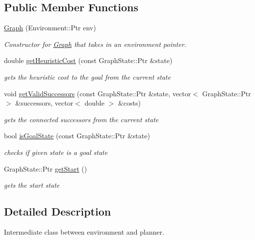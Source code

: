 \subsection*{\-Public \-Member \-Functions}
\begin{DoxyCompactItemize}
\item 
\hypertarget{class_graph_af17d59fad8e889152f8367600d1a6094}{\hyperlink{class_graph_af17d59fad8e889152f8367600d1a6094}{\-Graph} (\-Environment\-::\-Ptr env)}\label{class_graph_af17d59fad8e889152f8367600d1a6094}

\begin{DoxyCompactList}\small\item\em \-Constructor for \hyperlink{class_graph}{\-Graph} that takes in an environment pointer. \end{DoxyCompactList}\item 
double \hyperlink{class_graph_a24c1e21da4bb89a29539a2a1d3c6baed}{get\-Heuristic\-Cost} (const \-Graph\-State\-::\-Ptr \&state)
\begin{DoxyCompactList}\small\item\em gets the heuristic cost to the goal from the current state \end{DoxyCompactList}\item 
void \hyperlink{class_graph_a52790947468f8dbfa5c28bc1de1ba9b8}{get\-Valid\-Successors} (const \-Graph\-State\-::\-Ptr \&state, vector$<$ \-Graph\-State\-::\-Ptr $>$ \&successors, vector$<$ double $>$ \&costs)
\begin{DoxyCompactList}\small\item\em gets the connected successors from the current state \end{DoxyCompactList}\item 
bool \hyperlink{class_graph_a25beff23a7b3791bc9828e5533ecc45c}{is\-Goal\-State} (const \-Graph\-State\-::\-Ptr \&state)
\begin{DoxyCompactList}\small\item\em checks if given state is a goal state \end{DoxyCompactList}\item 
\-Graph\-State\-::\-Ptr \hyperlink{class_graph_a4de6e40cf94df5ae1e164d361e2ebac2}{get\-Start} ()
\begin{DoxyCompactList}\small\item\em gets the start state \end{DoxyCompactList}\end{DoxyCompactItemize}


\subsection{\-Detailed \-Description}
\-Intermediate class between environment and planner. 

